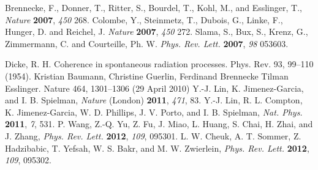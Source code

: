 \documentclass[atoms,article,submit,moreauthors,pdftex,12pt,a4paper]{mdpi}
\begin{document}
\begin{thebibliography}{999}
Brennecke, F., Donner, T., Ritter, S., Bourdel, T., Kohl, M., and Esslinger, T., {\em Nature} {\bf 2007}, {\em 450} 268.
Colombe, Y., Steinmetz, T., Dubois, G., Linke, F., Hunger, D. and Reichel, J. {\em Nature} {\bf 2007}, {\em 450} 272.
Slama, S., Bux, S., Krenz, G., Zimmermann, C. and Courteille, Ph. W. {\em Phys. Rev. Lett.} {\bf 2007}, {\em 98} 053603.

Dicke, R. H. Coherence in spontaneous radiation processes. Phys. Rev. 93, 99–110 (1954).
  Kristian Baumann,
  Christine Guerlin,
  Ferdinand Brennecke
 Tilman Esslinger.     Nature
    464,
    1301–1306
    (29 April 2010)
Y.-J. Lin, K. Jimenez-Garcia, and I. B. Spielman, {\em Nature} (London) {\bf 2011}, {\em 471}, 83.
Y.-J. Lin, R. L. Compton, K. Jimenez-Garcia, W. D. Phillips, J. V. Porto, and I. B. Spielman, {\em Nat. Phys.} {\bf 2011}, {\em 7}, 531.
P. Wang, Z.-Q. Yu, Z. Fu, J. Miao, L. Huang, S. Chai, H. Zhai, and J. Zhang, {\em Phys. Rev. Lett.} {\bf 2012}, {\em 109}, 095301.
L. W. Cheuk, A. T. Sommer, Z. Hadzibabic, T. Yefsah, W. S. Bakr, and M. W. Zwierlein, {\em Phys. Rev. Lett.} {\bf 2012}, {\em 109}, 095302.

\end{thebibliography}
\end{document}
